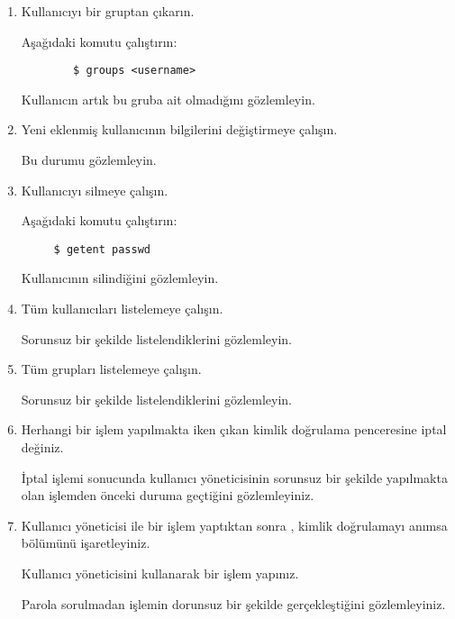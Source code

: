 \documentclass[a4paper,10pt]{article}
\begin{document}
\begin{enumerate}
\item Kullanıcıyı bir gruptan çıkarın.

       Aşağıdaki komutu çalıştırın:
    \begin{verbatim}
        $ groups <username> 
    \end{verbatim}
        Kullanıcın artık bu gruba ait olmadığını gözlemleyin.

\item Yeni eklenmiş kullanıcının bilgilerini değiştirmeye çalışın.

Bu durumu gözlemleyin.
\item Kullanıcıyı silmeye çalışın.

      Aşağıdaki komutu çalıştırın:
\begin{verbatim}
     $ getent passwd
\end{verbatim}
     Kullanıcının silindiğini gözlemleyin.

\item Tüm kullanıcıları listelemeye çalışın.

Sorunsuz bir şekilde listelendiklerini gözlemleyin.
\item Tüm grupları listelemeye çalışın.

Sorunsuz bir şekilde listelendiklerini gözlemleyin.

\item Herhangi bir işlem yapılmakta iken çıkan kimlik doğrulama penceresine iptal değiniz.

İptal işlemi sonucunda kullanıcı yöneticisinin sorunsuz bir şekilde yapılmakta olan işlemden önceki duruma geçtiğini gözlemleyiniz.

\item Kullanıcı yöneticisi ile bir işlem yaptıktan sonra , kimlik doğrulamayı anımsa bölümünü işaretleyiniz.

Kullanıcı yöneticisini kullanarak bir işlem yapınız.

Parola sorulmadan işlemin dorunsuz bir şekilde gerçekleştiğini gözlemleyiniz.

\end{enumerate}
\end{document}
